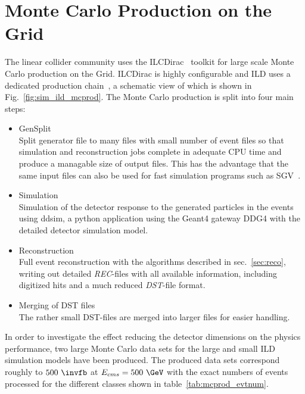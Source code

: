 \section{\label{sec:monte-carlo} Monte Carlo Production on the Grid}

The linear collider community uses the ILCDirac~\cite{Grefe:2014sca} toolkit for large scale Monte Carlo production on the Grid.
ILCDirac is highly configurable and ILD uses a dedicated production chain~\cite{Miyamoto:2019xve}, a schematic view of which is shown in Fig.~\ref{fig:sim_ild_mcprod}.
The Monte Carlo production is split into four main steps:
\begin{itemize}
\item GenSplit\\
  Split generator file to many files with small number of event files so that simulation and reconstruction jobs complete in adequate CPU time and 
produce a managable size of output files.  This has the advantage that the same input files can also be used for fast simulation programs such as SGV~\cite{Berggren:2012ar}.
\item Simulation\\
  Simulation of the detector response to the generated particles in the events using ddsim, a python application using the Geant4 gateway DDG4 with
  the detailed detector simulation model.
\item Reconstruction\\
  Full event reconstruction with the algorithms described in sec.~\ref{sec:reco}, writing out detailed \emph{REC}-files with all available information,
  including digitized hits and a much reduced \emph{DST}-file format.
\item{Merging of DST files}\\
  The rather small DST-files are merged into larger files for easier handling.
\end{itemize}
%
In order to investigate the effect reducing the detector dimensions on the physics performance, two large Monte Carlo data sets for the large and small
ILD simulation models have been produced. The produced data sets correspond roughly to $500~\invfb$ at $E_{cms}=500~\GeV$ with the exact numbers of
events processed for the different classes shown in table~\ref{tab:mcprod_evtnum}.

